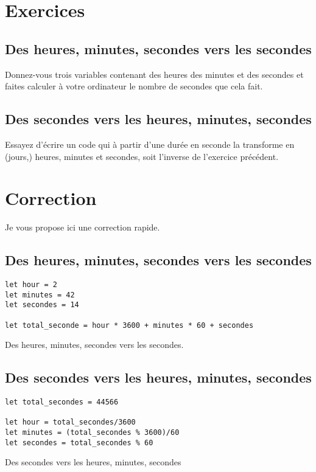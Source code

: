 \section*{Exercices}
{}
\subsection*{Des heures, minutes, secondes vers les secondes}
{}
Donnez-vous trois variables contenant des heures des minutes et des secondes
et faites calculer à votre ordinateur le nombre de secondes que cela fait.


\subsection*{Des secondes vers les heures, minutes, secondes}
{} 
Essayez d'écrire un code qui à partir d'une durée en seconde la transforme en (jours,) heures, minutes et secondes, soit l'inverse de l'exercice précédent.

\pagebreak %

\section*{Correction}
{}
Je vous propose ici une correction rapide.
\subsection*{Des heures, minutes, secondes vers les secondes}
{}
\begin{listing}[h]
\begin{verbatim}
let hour = 2
let minutes = 42
let secondes = 14

let total_seconde = hour * 3600 + minutes * 60 + secondes
\end{verbatim}
\caption{Des heures, minutes, secondes vers les secondes.}
\end{listing}

\subsection*{Des secondes vers les heures, minutes, secondes}
{} 
\begin{listing}[h]
\begin{verbatim}
let total_secondes = 44566

let hour = total_secondes/3600
let minutes = (total_secondes % 3600)/60
let secondes = total_secondes % 60
\end{verbatim}
\caption{Des secondes vers les heures, minutes, secondes}
\end{listing}
